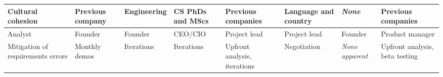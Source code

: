 \begin{landscape}
\begin{table}[tbp]
{\begin{tabular}{p{2.3cm}p{2.3cm}p{2.3cm}p{2.3cm}p{2.3cm}p{2.3cm}p{2.3cm}p{2.3cm}}
\hline
\vspace{0.5pt} Cultural cohesion & \vspace{0.5pt} Previous company & \vspace{0.5pt} Engineering & \vspace{0.5pt} CS PhDs and MScs & \vspace{0.5pt} Previous companies & \vspace{0.5pt} Language and country & \vspace{0.5pt} \emph{None} & \vspace{0.5pt} Previous companies \\
\hline
\vspace{0.5pt} Analyst & \vspace{0.5pt} Founder & \vspace{0.5pt} Founder & \vspace{0.5pt} CEO/CIO & \vspace{0.5pt} Project lead & \vspace{0.5pt} Project lead & \vspace{0.5pt} Founder & \vspace{0.5pt} Product manager \\
\hline
\vspace{0.5pt} Mitigation of requirements errors & \vspace{0.5pt} Monthly demos & \vspace{0.5pt} Iterations & \vspace{0.5pt} Iterations & \vspace{0.5pt} Upfront analysis, iterations & \vspace{0.5pt} Negotiation & \vspace{0.5pt} \emph{None apparent} & \vspace{0.5pt} Upfront analysis, beta testing \\
\hline
\end{tabular}}
\end{table}
\end{landscape}

